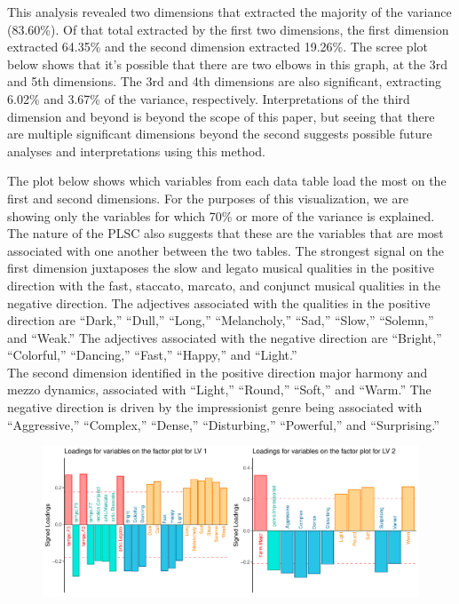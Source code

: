\documentclass[
  english,
  man,floatsintext]{apa6}
\begin{document}
This analysis revealed two dimensions that extracted the majority of the variance (83.60\%). Of that total extracted by the first two dimensions, the first dimension extracted 64.35\% and the second dimension extracted 19.26\%. The scree plot below shows that it's possible that there are two elbows in this graph, at the 3rd and 5th dimensions. The 3rd and 4th dimensions are also significant, extracting 6.02\% and 3.67\% of the variance, respectively. Interpretations of the third dimension and beyond is beyond the scope of this paper, but seeing that there are multiple significant dimensions beyond the second suggests possible future analyses and interpretations using this method.

The plot below shows which variables from each data table load the most on the first and second dimensions. For the purposes of this visualization, we are showing only the variables for which 70\% or more of the variance is explained. The nature of the PLSC also suggests that these are the variables that are most associated with one another between the two tables. The strongest signal on the first dimension juxtaposes the slow and legato musical qualities in the positive direction with the fast, staccato, marcato, and conjunct musical qualities in the negative direction. The adjectives associated with the qualities in the positive direction are ``Dark,'' ``Dull,'' ``Long,'' ``Melancholy,'' ``Sad,'' ``Slow,'' ``Solemn,'' and ``Weak.'' The adjectives associated with the negative direction are ``Bright,'' ``Colorful,'' ``Dancing,'' ``Fast,'' ``Happy,'' and ``Light.''\\
The second dimension identified in the positive direction major harmony and mezzo dynamics, associated with ``Light,'' ``Round,'' ``Soft,'' and ``Warm.'' The negative direction is driven by the impressionist genre being associated with ``Aggressive,'' ``Complex,'' ``Dense,'' ``Disturbing,'' ``Powerful,'' and ``Surprising.''

\begin{figure}

{\centering \includegraphics{Music-Descriptor-Space_files/figure-latex/loadingsplsc-1} 

}

\caption{ }\label{fig:loadingsplsc}
\end{figure}
\end{document}
